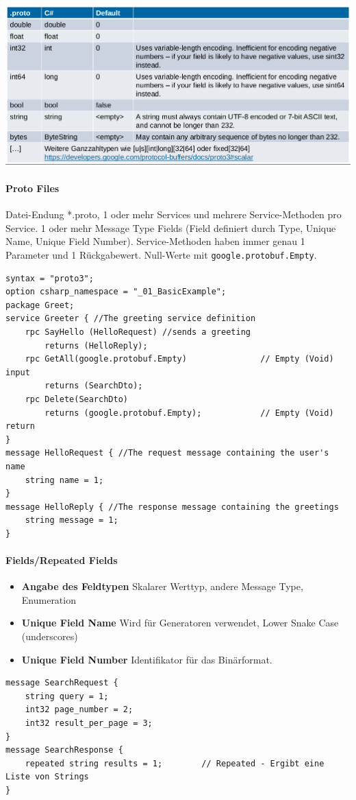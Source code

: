 \documentclass[
a4paper,
oneside,
10pt,
fleqn,
headsepline,
toc=listofnumbered, 
bibliography=totocnumbered]{scrartcl}
\begin{document}
\begin{minipage}[t]{0.9\textwidth}
	\centering
	\includegraphics[width=0.9\linewidth]{images/grpc_buffers.png}
\end{minipage}

\paragraph{Proto Files} Datei-Endung *.proto, 1 oder mehr Services und mehrere Service-Methoden pro Service. 1 oder mehr Message Type Fields (Field definiert durch Type, Unique Name, Unique Field Number). Service-Methoden haben immer genau 1 Parameter und 1 Rückgabewert. Null-Werte mit \lstinline|google.protobuf.Empty|.
\begin{lstlisting}
syntax = "proto3";
option csharp_namespace = "_01_BasicExample";
package Greet;
service Greeter { //The greeting service definition
    rpc SayHello (HelloRequest) //sends a greeting
        returns (HelloReply);
    rpc GetAll(google.protobuf.Empty)               // Empty (Void) input
        returns (SearchDto);
    rpc Delete(SearchDto)
		returns (google.protobuf.Empty);            // Empty (Void) return
}
message HelloRequest { //The request message containing the user's name
    string name = 1;
}
message HelloReply { //The response message containing the greetings
    string message = 1;
}
\end{lstlisting}

\paragraph{Fields/Repeated Fields}
\begin{itemize}
	\item \textbf{Angabe des Feldtypen} Skalarer Werttyp, andere Message Type, Enumeration
	\item \textbf{Unique Field Name} Wird für Generatoren verwendet, Lower Snake Case (underscores)
	\item \textbf{Unique Field Number} Identifikator für das Binärformat.
\end{itemize}
\begin{lstlisting}
message SearchRequest {
    string query = 1;
    int32 page_number = 2;
    int32 result_per_page = 3;
}
message SearchResponse {
    repeated string results = 1;        // Repeated - Ergibt eine Liste von Strings
}
\end{lstlisting}
\end{document}
